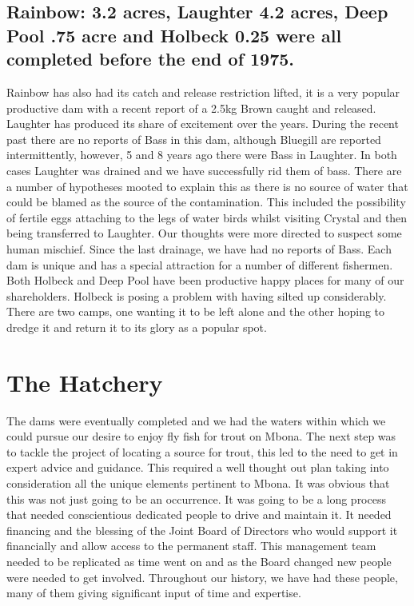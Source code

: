 \subsection*{Rainbow: 3.2 acres, Laughter 4.2 acres, Deep Pool .75 acre and Holbeck 0.25 were all completed before the end of 1975.}

Rainbow has also had its catch and release restriction lifted, it is a very popular productive dam with a recent report of a 
2.5kg Brown caught and released.
Laughter has produced its share of excitement over the years. During the recent past there are no reports of Bass in this dam, 
although Bluegill are reported intermittently, however, 5 and 8 years ago there were Bass in Laughter. In both cases Laughter 
was drained and we have successfully rid  them of bass. There are a number of hypotheses mooted to explain this as there is 
no source of water that could be blamed as the source of the contamination. This included the possibility of fertile eggs attaching 
to the legs of water birds whilst visiting Crystal and then being transferred to Laughter. Our thoughts were more directed to 
suspect some human mischief. Since the last drainage, we have had no reports of Bass.
Each dam is unique and has a special attraction for a number of different fishermen. Both Holbeck and Deep Pool have been 
productive happy places for many of our shareholders. Holbeck is posing a problem with having silted up considerably. 
There are two camps, one wanting it to be left alone and the other hoping to dredge it and return it to its glory as a popular spot.

\section{The Hatchery}

The dams were eventually completed and we had the waters within which we could pursue our desire to enjoy fly fish for trout on Mbona.
The next step was to tackle the project of locating a source for trout, this led to the need to get in expert advice and guidance. 
This required a well thought out plan taking into consideration all the unique elements pertinent to Mbona. 
It was obvious that this was not just going to be an occurrence. It was going to be a long process that needed 
conscientious dedicated people to drive and maintain it. 
It needed financing and the blessing of the Joint Board of Directors who would support it financially and allow access to 
the permanent staff. This management team needed to be replicated as time went on and as the Board changed new 
people were needed to get involved. Throughout our history, we have had these people, 
many of them giving significant input of time and expertise. 

